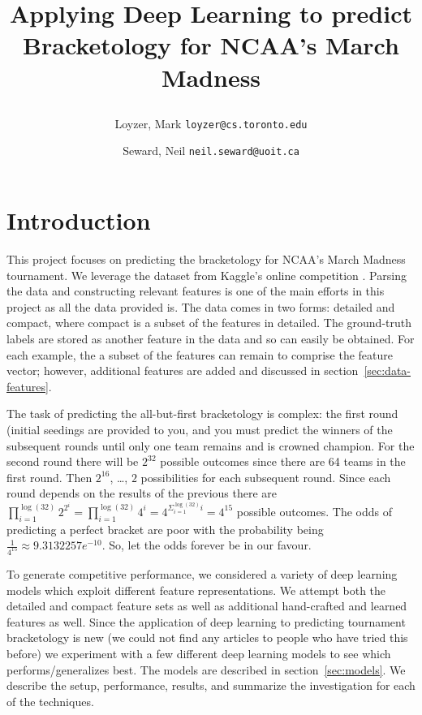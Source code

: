 \documentclass{article} %
\begin{document}
\title{Applying Deep Learning to predict Bracketology for NCAA's March Madness
\author[1]{Loyzer, Mark \texttt{loyzer@cs.toronto.edu}}
\author[2]{Seward, Neil \texttt{neil.seward@uoit.ca}}
}





\newcommand{\fix}{\marginpar{FIX}}
\newcommand{\new}{\marginpar{NEW}}

\nipsfinalcopy %

\maketitle

\section{Introduction}
This project focuses on predicting the bracketology for NCAA's March Madness tournament.
We leverage the dataset from Kaggle's online competition \citep{kagglecompetition}.
Parsing the data and constructing relevant features is one of the main efforts in this project as all the data provided is.
The data comes in two forms: detailed and compact, where compact is a subset of the features in detailed.
The ground-truth labels are stored as another feature in the data and so can easily be obtained.
For each example, the a subset of the features can remain to comprise the feature vector; however, additional features are added and discussed in section~\ref{sec:data-features}.


The task of predicting the all-but-first bracketology is complex: the first round (initial seedings are provided to you, and you must predict the winners of the subsequent rounds until only one team remains and is crowned champion.
For the second round there will be $2^{32}$ possible outcomes since there are 64 teams in the first round.
Then $2^{16}$, \dots, $2$ possibilities for each subsequent round.
Since each round depends on the results of the previous there are $\prod_{i=1}^{\log(32)} 2^{2^{i}} = \prod_{i=1}^{\log(32)} 4^{i} = 4^{\Sigma_{i=1}^{\log(32)} i} = 4^{15}$ possible outcomes.
 The odds of predicting a perfect bracket are poor with the probability being $\frac{1}{4^{15}} \approx 9.3132257e^{-10}$.
So, let the odds forever be in our favour.


To generate competitive performance, we considered a variety of deep learning models which exploit different feature representations.
We attempt both the detailed and compact feature sets as well as additional hand-crafted and learned features as well.
Since the application of deep learning to predicting tournament bracketology is new (we could not find any articles to people who have tried this before) we experiment with a few different deep learning models to see which performs/generalizes best.
The models are described in section~\ref{sec:models}.
We describe the setup, performance, results, and summarize the investigation for each of the techniques.
\end{document}
